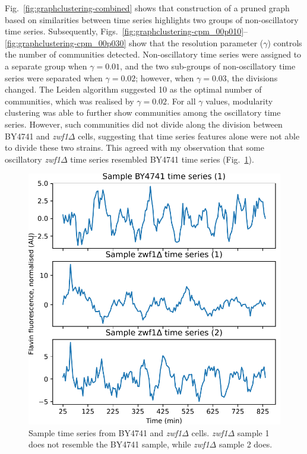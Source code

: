 Fig.\ \ref{fig:graphclustering-combined} shows that construction of a pruned graph based on similarities between time series highlights two groups of non-oscillatory time series.
Subsequently, Figs.\ \ref{fig:graphclustering-cpm_00p010}--\ref{fig:graphclustering-cpm_00p030} show that the resolution parameter ($\gamma$) controls the number of communities detected.
Non-oscillatory time series were assigned to a separate group when $\gamma = 0.01$, and the two sub-groups of non-oscillatory time series were separated when $\gamma = 0.02$; however, when $\gamma = 0.03$, the divisions changed.
The Leiden algorithm \parencite{traagLouvainLeidenGuaranteeing2019} suggested 10 as the optimal number of communities, which was realised by $\gamma = 0.02$.
For all $\gamma$ values, modularity clustering was able to further show communities among the oscillatory time series.
However, such communities did not divide along the division between BY4741 and \textit{zwf1$\Delta$} cells, suggesting that time series features alone were not able to divide these two strains.
This agreed with my observation that some oscillatory \textit{zwf1$\Delta$} time series resembled BY4741 time series (Fig.\ \ref{fig:analysis-sample-zwf1}).

\begin{figure}
  \centering
  \includegraphics[width=0.6\linewidth]{sample_ts_zwf1.pdf}

  \caption[
    Sample time series from BY4741 and \textit{zwf1$\Delta$} cells.
  ]{
    Sample time series from BY4741 and \textit{zwf1$\Delta$} cells.
    \textit{zwf1$\Delta$} sample 1 does not resemble the BY4741 sample, while \textit{zwf1$\Delta$} sample 2 does.
  }
  \label{fig:analysis-sample-zwf1}
\end{figure}


